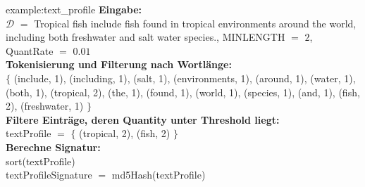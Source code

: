 \begin{example}{example:text_profile}
	\textbf{Eingabe:}\\
		$\mathcal{D}$ $=$ \glqq Tropical fish include fish found in tropical environments around the world,
			including both freshwater and salt water species.\grqq,
		MINLENGTH $=$ $2$, QuantRate $=$ $0.01$\\
	
	\textbf{Tokenisierung und Filterung nach Wortlänge:}\\
		$\{$ (include, 1), (including, 1), (salt, 1), (environments, 1), (around, 1), (water, 1),
			(both, 1), (tropical, 2), (the, 1), (found, 1), (world, 1), (species, 1), (and, 1), (fish, 2), (freshwater, 1) $\}$\\

	\textbf{Filtere Einträge, deren Quantity unter Threshold liegt:}\\
		textProfile $=$ $\{$ (tropical, 2), (fish, 2) $\}$\\
	
	\textbf{Berechne Signatur:}\\
		sort(textProfile)\\
		textProfileSignature $=$ md5Hash(textProfile)
\end{example}
